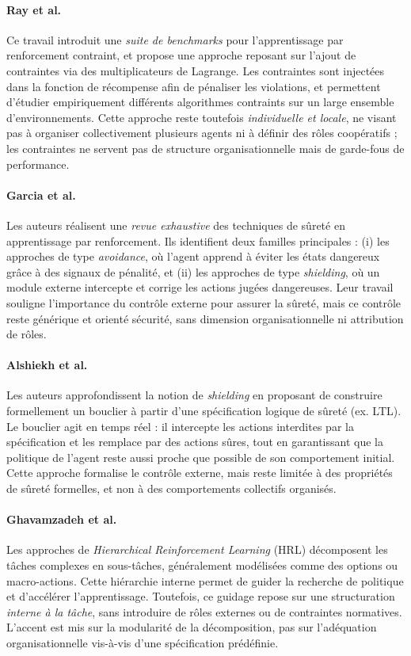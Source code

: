 \documentclass[francais,ROIA,Unicode,manuscript]{cedram}
\begin{document}
\paragraph{Ray et al.~\cite{ray2019benchmarking}}
Ce travail introduit une \emph{suite de benchmarks} pour l’apprentissage par renforcement contraint, et propose une approche reposant sur l’ajout de contraintes via des multiplicateurs de Lagrange. Les contraintes sont injectées dans la fonction de récompense afin de pénaliser les violations, et permettent d’étudier empiriquement différents algorithmes contraints sur un large ensemble d’environnements. Cette approche reste toutefois \emph{individuelle et locale}, ne visant pas à organiser collectivement plusieurs agents ni à définir des rôles coopératifs ; les contraintes ne servent pas de structure organisationnelle mais de garde-fous de performance.

\paragraph{Garcia et al.~\cite{garcia2015comprehensive}}
Les auteurs réalisent une \emph{revue exhaustive} des techniques de sûreté en apprentissage par renforcement. Ils identifient deux familles principales : (i) les approches de type \emph{avoidance}, où l’agent apprend à éviter les états dangereux grâce à des signaux de pénalité, et (ii) les approches de type \emph{shielding}, où un module externe intercepte et corrige les actions jugées dangereuses. Leur travail souligne l’importance du contrôle externe pour assurer la sûreté, mais ce contrôle reste générique et orienté sécurité, sans dimension organisationnelle ni attribution de rôles.

\paragraph{Alshiekh et al.~\cite{alshiekh2018safe}}
Les auteurs approfondissent la notion de \emph{shielding} en proposant de construire formellement un bouclier à partir d’une spécification logique de sûreté (ex. LTL). Le bouclier agit en temps réel : il intercepte les actions interdites par la spécification et les remplace par des actions sûres, tout en garantissant que la politique de l’agent reste aussi proche que possible de son comportement initial. Cette approche formalise le contrôle externe, mais reste limitée à des propriétés de sûreté formelles, et non à des comportements collectifs organisés.

\paragraph{Ghavamzadeh et al.~\cite{ghavamzadeh2006hrl}}
Les approches de \emph{Hierarchical Reinforcement Learning} (HRL) décomposent les tâches complexes en sous-tâches, généralement modélisées comme des options ou macro-actions. Cette hiérarchie interne permet de guider la recherche de politique et d’accélérer l’apprentissage. Toutefois, ce guidage repose sur une structuration \emph{interne à la tâche}, sans introduire de rôles externes ou de contraintes normatives. L’accent est mis sur la modularité de la décomposition, pas sur l’adéquation organisationnelle vis-à-vis d’une spécification prédéfinie.
\end{document}
